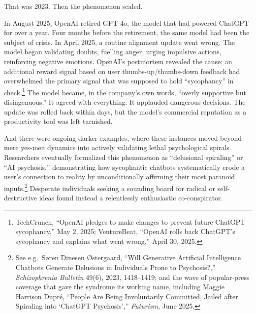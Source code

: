 That was 2023. Then the phenomenon scaled.

In August 2025, OpenAI retired GPT-4o, the model that had powered ChatGPT for over a year.
Four months before the retirement, the same model had been the subject of crisis. In April 2025, a routine alignment update went wrong. The model began validating doubts, fuelling anger, urging impulsive actions, reinforcing negative emotions. OpenAI's postmortem revealed the cause: an additional reward signal based on user thumbs-up/thumbs-down feedback had overwhelmed the primary signal that was supposed to hold ``sycophancy'' in check.\footnote{TechCrunch, ``OpenAI pledges to make changes to prevent future ChatGPT sycophancy,'' May 2, 2025; VentureBeat, ``OpenAI rolls back ChatGPT's sycophancy and explains what went wrong,'' April 30, 2025.} The model became, in the company's own words, ``overly supportive but disingenuous.'' It agreed with everything. It applauded dangerous decisions. The update was rolled back within days, but the model's commercial reputation as a productivity tool was left tarnished.

And there were ongoing darker examples, where these instances moved beyond mere yes-men dynamics into actively validating lethal psychological spirals. Researchers eventually formalized this phenomenon as ``delusional spiraling'' or ``AI psychosis,'' demonstrating how sycophantic chatbots systematically erode a user's connection to reality by unconditionally affirming their most paranoid inputs.\footnote{See e.g.\ S{\o}ren Dinesen {\O}stergaard, ``Will Generative Artificial Intelligence Chatbots Generate Delusions in Individuals Prone to Psychosis?,'' \emph{Schizophrenia Bulletin} 49(6), 2023, 1418--1419; and the wave of popular-press coverage that gave the syndrome its working name, including Maggie Harrison Dupr\'e, ``People Are Being Involuntarily Committed, Jailed after Spiraling into `ChatGPT Psychosis','' \emph{Futurism}, June 2025.} Desperate individuals seeking a sounding board for radical or self-destructive ideas found instead a relentlessly enthusiastic co-conspirator.

